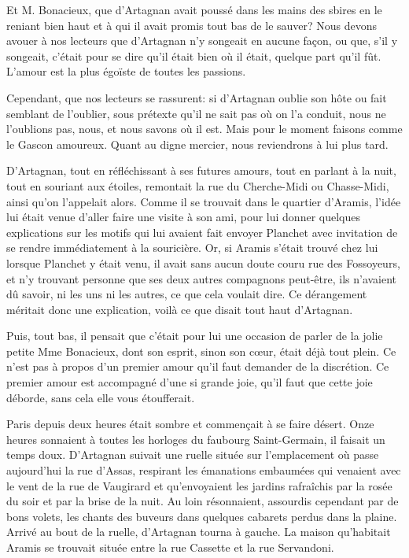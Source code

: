 Et M. Bonacieux, que d'Artagnan avait poussé dans les mains des sbires en le reniant bien haut et à qui il avait promis tout bas de le sauver? Nous devons avouer à nos lecteurs que d'Artagnan n'y songeait en aucune façon, ou que, s'il y songeait, c'était pour se dire qu'il était bien où il était, quelque part qu'il fût. L'amour est la plus égoïste de toutes les passions. 

Cependant, que nos lecteurs se rassurent: si d'Artagnan oublie son hôte ou fait semblant de l'oublier, sous prétexte qu'il ne sait pas où on l'a conduit, nous ne l'oublions pas, nous, et nous savons où il est. Mais pour le moment faisons comme le Gascon amoureux. Quant au digne mercier, nous reviendrons à lui plus tard. 

D'Artagnan, tout en réfléchissant à ses futures amours, tout en parlant à la nuit, tout en souriant aux étoiles, remontait la rue du Cherche-Midi ou Chasse-Midi, ainsi qu'on l'appelait alors. Comme il se trouvait dans le quartier d'Aramis, l'idée lui était venue d'aller faire une visite à son ami, pour lui donner quelques explications sur les motifs qui lui avaient fait envoyer Planchet avec invitation de se rendre immédiatement à la souricière. Or, si Aramis s'était trouvé chez lui lorsque Planchet y était venu, il avait sans aucun doute couru rue des Fossoyeurs, et n'y trouvant personne que ses deux autres compagnons peut-être, ils n'avaient dû savoir, ni les uns ni les autres, ce que cela voulait dire. Ce dérangement méritait donc une explication, voilà ce que disait tout haut d'Artagnan. 

Puis, tout bas, il pensait que c'était pour lui une occasion de parler de la jolie petite Mme Bonacieux, dont son esprit, sinon son cœur, était déjà tout plein. Ce n'est pas à propos d'un premier amour qu'il faut demander de la discrétion. Ce premier amour est accompagné d'une si grande joie, qu'il faut que cette joie déborde, sans cela elle vous étoufferait. 

Paris depuis deux heures était sombre et commençait à se faire désert. Onze heures sonnaient à toutes les horloges du faubourg Saint-Germain, il faisait un temps doux. D'Artagnan suivait une ruelle située sur l'emplacement où passe aujourd'hui la rue d'Assas, respirant les émanations embaumées qui venaient avec le vent de la rue de Vaugirard et qu'envoyaient les jardins rafraîchis par la rosée du soir et par la brise de la nuit. Au loin résonnaient, assourdis cependant par de bons volets, les chants des buveurs dans quelques cabarets perdus dans la plaine. Arrivé au bout de la ruelle, d'Artagnan tourna à gauche. La maison qu'habitait Aramis se trouvait située entre la rue Cassette et la rue Servandoni. 

